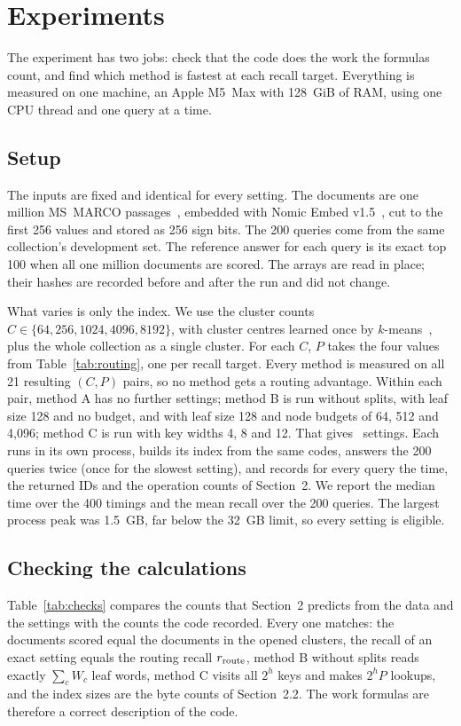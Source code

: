 \section{Experiments}

The experiment has two jobs: check that the code does the work the formulas count, and find
which method is fastest at each recall target. Everything is measured on one machine, an
Apple M5~Max with 128~GiB of RAM, using one CPU thread and one query at a time.

\subsection{Setup}
The inputs are fixed and identical for every setting. The documents are one million
MS~MARCO passages~\cite{msmarco}, embedded with Nomic Embed v1.5~\cite{nomic}, cut to the
first 256 values and stored as 256 sign bits. The 200 queries come from the same collection's
development set. The reference answer for each query is its exact top 100 when all one
million documents are scored. The arrays are read in place; their hashes are recorded before
and after the run and did not change.

What varies is only the index. We use the cluster counts $C\in\{64,256,1024,4096,8192\}$,
with cluster centres learned once by $k$-means~\cite{faiss}, plus the whole collection as a
single cluster. For each $C$, $P$ takes the four values from Table~\ref{tab:routing}, one
per recall target. Every method is measured on all 21 resulting $(C,P)$ pairs, so no
method gets a routing advantage. Within each pair, method A has no further settings; method B
is run without splits, with leaf size 128 and no budget, and with leaf size 128 and node
budgets of 64, 512 and 4,096; method C is run with key widths 4, 8 and 12. That gives
\settingsMeasured\ settings. Each runs in its own process, builds its index from the same
codes, answers the 200 queries twice (once for the slowest setting), and records for every
query the time, the returned IDs and the operation counts of Section~2. We report the median
time over the 400 timings and the mean recall over the 200 queries. The largest process
peak was 1.5~GB, far below the 32~GB limit, so every setting is eligible.

\subsection{Checking the calculations}
Table~\ref{tab:checks} compares the counts that Section~2 predicts from the data and the
settings with the counts the code recorded. Every one matches: the documents scored equal
the documents in the opened clusters, the recall of an exact setting equals the routing
recall $r_{\rm route}$, method B without splits reads exactly $\sum_cW_c$ leaf words, method
C visits all $2^h$ keys and makes $2^hP$ lookups, and the index sizes are the byte counts of
Section~2.2. The work formulas are therefore a correct description of the code.

